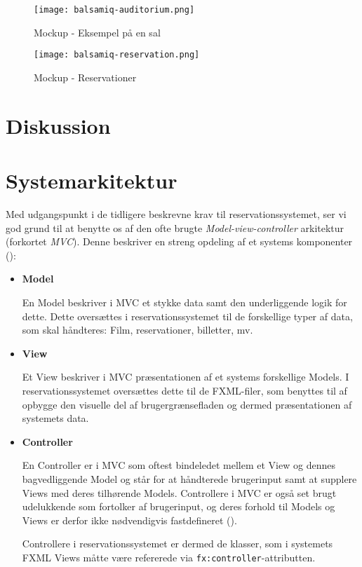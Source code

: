 \begin{figure}[h]
  \centering
  \texttt{[image: balsamiq-auditorium.png]}
  \caption{Mockup - Eksempel på en sal}
  \label{mockup: balsamiq-auditorium}
\end{figure}

\begin{figure}[h]
  \centering
  \texttt{[image: balsamiq-reservation.png]}
  \caption{Mockup - Reservationer}
  \label{mockup: balsamiq-reservation}
\end{figure}

\section{Diskussion}

\section{Systemarkitektur}

Med udgangspunkt i de tidligere beskrevne krav til reservationssystemet, ser vi god grund til at benytte os af den ofte brugte \textit{Model-view-controller} arkitektur (forkortet \textit{MVC}). Denne beskriver en streng opdeling af et systems komponenter (\cite{wiki:mvc}):

\begin{itemize}
  \item
    \textbf{Model}
  
    En Model beskriver i MVC et stykke data samt den underliggende logik for dette. Dette oversættes i reservationssystemet til de forskellige typer af data, som skal håndteres: Film, reservationer, billetter, mv.
  \item
    \textbf{View}
    
    Et View beskriver i MVC præsentationen af et systems forskellige Models. I reservationssystemet oversættes dette til de FXML-filer, som benyttes til af opbygge den visuelle del af brugergrænsefladen og dermed præsentationen af systemets data.
  \item
    \textbf{Controller}
    
    En Controller er i MVC som oftest bindeledet mellem et View og dennes bagvedliggende Model og står for at håndterede brugerinput samt at supplere Views med deres tilhørende Models. Controllere i MVC er også set brugt udelukkende som fortolker af brugerinput, og deres forhold til Models og Views er derfor ikke nødvendigvis fastdefineret (\cite{burbeck1987}).
    
    Controllere i reservationssystemet er dermed de klasser, som i systemets FXML Views måtte være refererede via \texttt{fx:controller}-attributten.
\end{itemize}
